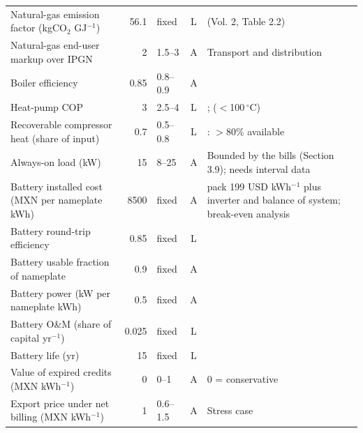 {\begin{longtable}{p{4.4cm}rlcp{4.0cm}}
Natural-gas emission factor (kgCO$_2$ GJ$^{-1}$) & 56.1 & fixed & L & \cite{ipcc2006} (Vol. 2, Table 2.2) \\
Natural-gas end-user markup over IPGN & 2 & 1.5--3 & A & Transport and distribution \\
Boiler efficiency & 0.85 & 0.8--0.9 & A &  \\
Heat-pump COP & 3 & 2.5--4 & L & \cite{arpagaus2018}; \cite{schlosser2020} ($<$100\,$^\circ$C) \\
Recoverable compressor heat (share of input) & 0.7 & 0.5--0.8 & L & \cite{doe2016compressed}: $>$80\% available \\
Always-on load (kW) & 15 & 8--25 & A & Bounded by the bills (Section 3.9); needs interval data \\
Battery installed cost (MXN per nameplate kWh) & 8500 & fixed & A & \cite{nrel2024atb} pack 199 USD kWh$^{-1}$ plus inverter and balance of system; break-even analysis \\
Battery round-trip efficiency & 0.85 & fixed & L & \cite{nrel2024atb} \\
Battery usable fraction of nameplate & 0.9 & fixed & A &  \\
Battery power (kW per nameplate kWh) & 0.5 & fixed & A &  \\
Battery O\&M (share of capital yr$^{-1}$) & 0.025 & fixed & L & \cite{nrel2024atb} \\
Battery life (yr) & 15 & fixed & L & \cite{nrel2024atb} \\
Value of expired credits (MXN kWh$^{-1}$) & 0 & 0--1 & A & 0 = conservative \\
Export price under net billing (MXN kWh$^{-1}$) & 1 & 0.6--1.5 & A & Stress case \\
\bottomrule
\end{longtable}}
